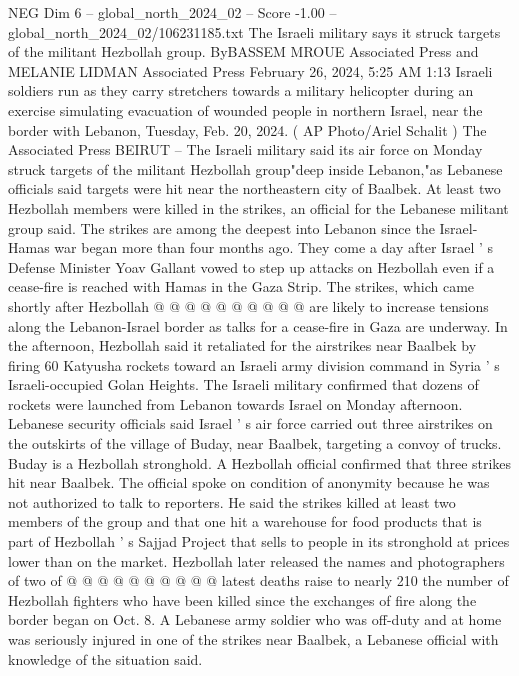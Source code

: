 \begin{textsample}{NEG Dim 6 – global\_north\_2024\_02 – Score -1.00 – global\_north\_2024\_02/106231185.txt}  \label{ex:f6_neg_277}
The Israeli military says it struck targets of the militant Hezbollah group.
ByBASSEM MROUE Associated Press and MELANIE LIDMAN Associated Press February 26, 2024, 5:25 AM 1:13 Israeli soldiers run as they carry stretchers towards a military helicopter during an exercise simulating evacuation of wounded people in northern Israel, near the border with Lebanon, Tuesday, Feb. 20, 2024. ( AP Photo/Ariel Schalit ) The Associated Press BEIRUT -- The Israeli military said its air force on Monday struck targets of the militant Hezbollah group"deep inside Lebanon,"as Lebanese officials said targets were hit near the northeastern city of Baalbek.
At least two Hezbollah members were killed in the strikes, an official for the Lebanese militant group said.
The strikes are among the deepest into Lebanon since the Israel-Hamas war began more than four months ago.
They come a day after Israel ' s Defense Minister Yoav Gallant vowed to step up attacks on Hezbollah even if a cease-fire is reached with Hamas in the Gaza Strip.
The strikes, which came shortly after Hezbollah @ @ @ @ @ @ @ @ @ @ are likely to increase tensions along the Lebanon-Israel border as talks for a cease-fire in Gaza are underway.
In the afternoon, Hezbollah said it retaliated for the airstrikes near Baalbek by firing 60 Katyusha rockets toward an Israeli army division command in Syria ' s Israeli-occupied Golan Heights.
The Israeli military confirmed that dozens of rockets were launched from Lebanon towards Israel on Monday afternoon.
Lebanese security officials said Israel ' s air force carried out three airstrikes on the outskirts of the village of Buday, near Baalbek, targeting a convoy of trucks.
Buday is a Hezbollah stronghold.
A Hezbollah official confirmed that three strikes hit near Baalbek.
The official spoke on condition of anonymity because he was not authorized to talk to reporters.
He said the strikes killed at least two members of the group and that one hit a warehouse for food products that is part of Hezbollah ' s Sajjad Project that sells to people in its stronghold at prices lower than on the market.
Hezbollah later released the names and photographers of two of @ @ @ @ @ @ @ @ @ @ latest deaths raise to nearly 210 the number of Hezbollah fighters who have been killed since the exchanges of fire along the border began on Oct. 8.
A Lebanese army soldier who was off-duty and at home was seriously injured in one of the strikes near Baalbek, a Lebanese official with knowledge of the situation said.

\end{textsample}
